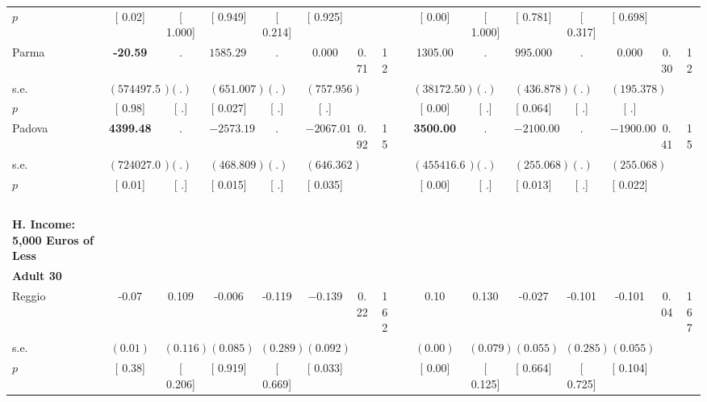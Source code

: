 \begin{longtable}{L{8em} c c c c c c c p{1em} c c c c c c c}
\quad \quad \quad \quad $ p$ & [     0.02] & [    1.000] & [    0.949] & [    0.214] & [    0.925] & & & & [     0.00] & [    1.000] & [    0.781] & [    0.317] & [    0.698] & &  \\[1em]
\quad \quad \quad Parma& \textbf{   -20.59} &         . & $ \mathbf{ 1585.294}$ &         . &     0.000 &      0.71 &        12 & & 1305.00 &         . & $ \mathbf{  995.000}$ &         . &     0.000 &      0.30 &        12  \\*
\quad \quad \quad \quad s.e.& $ (574497.58)$ & $ (        .)$ & $ (  651.007)$ & $ (        .)$ & $ (  757.956)$ & & & & $ ( 38172.50)$ & $ (        .)$ & $ (  436.878)$ & $ (        .)$ & $ (  195.378)$ & &  \\*
\quad \quad \quad \quad $ p$ & [     0.98] & [        .] & [    0.027] & [        .] & [        .] & & & & [     0.00] & [        .] & [    0.064] & [        .] & [        .] & &  \\[1em]
\quad \quad \quad Padova& \textbf{  4399.48} &         . & $ \mathbf{-2573.196}$ &         . & $ \mathbf{-2067.010}$ &      0.92 &        15 & & \textbf{  3500.00} &         . & $ \mathbf{-2100.000}$ &         . & $ \mathbf{-1900.000}$ &      0.41 &        15  \\*
\quad \quad \quad \quad s.e.& $ (724027.00)$ & $ (        .)$ & $ (  468.809)$ & $ (        .)$ & $ (  646.362)$ & & & & $ (455416.67)$ & $ (        .)$ & $ (  255.068)$ & $ (        .)$ & $ (  255.068)$ & &  \\*
\quad \quad \quad \quad $ p$ & [     0.01] & [        .] & [    0.015] & [        .] & [    0.035] & & & & [     0.00] & [        .] & [    0.013] & [        .] & [    0.022] & &  \\[1em]
~\\[1em]
\textbf{H. Income: 5,000 Euros of Less} \\*
\quad \quad \textbf{Adult 30} & & & & & & & & & & & & & & & \\* 
\quad \quad \quad Reggio& -0.07 &     0.109 &    -0.006 &    -0.119 & $ \mathbf{   -0.139}$ &      0.22 &       162 & & 0.10 &     0.130 &    -0.027 &    -0.101 &    -0.101 &      0.04 &       167  \\*
\quad \quad \quad \quad s.e.& $ (     0.01)$ & $ (    0.116)$ & $ (    0.085)$ & $ (    0.289)$ & $ (    0.092)$ & & & & $ (     0.00)$ & $ (    0.079)$ & $ (    0.055)$ & $ (    0.285)$ & $ (    0.055)$ & &  \\*
\quad \quad \quad \quad $ p$ & [     0.38] & [    0.206] & [    0.919] & [    0.669] & [    0.033] & & & & [     0.00] & [    0.125] & [    0.664] & [    0.725] & [    0.104] & &  \\[1em]

\end{longtable}
